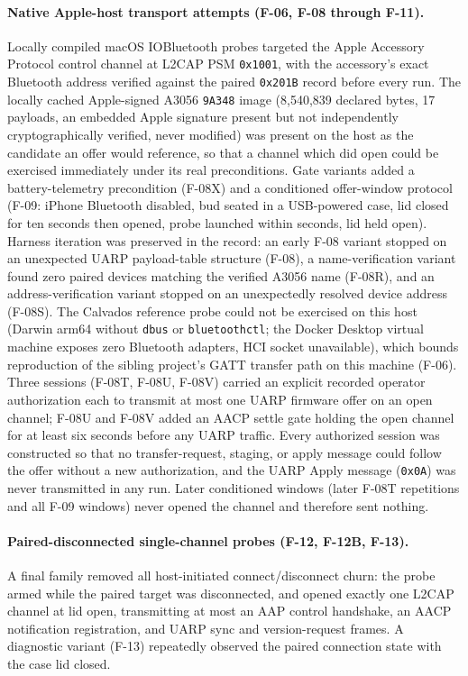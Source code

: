 \documentclass[11pt,letterpaper]{article}
\begin{document}
\paragraph{Native Apple-host transport attempts (F-06, F-08 through F-11).}
Locally compiled macOS IOBluetooth probes targeted the Apple Accessory Protocol control channel at L2CAP PSM \texttt{0x1001}, with the accessory's exact Bluetooth address verified against the paired \texttt{0x201B} record before every run. The locally cached Apple-signed A3056 \texttt{9A348} image (8,540,839 declared bytes, 17 payloads, an embedded Apple signature present but not independently cryptographically verified, never modified) was present on the host as the candidate an offer would reference, so that a channel which did open could be exercised immediately under its real preconditions. Gate variants added a battery-telemetry precondition (F-08X) and a conditioned offer-window protocol (F-09: iPhone Bluetooth disabled, bud seated in a USB-powered case, lid closed for ten seconds then opened, probe launched within seconds, lid held open). Harness iteration was preserved in the record: an early F-08 variant stopped on an unexpected UARP payload-table structure (F-08), a name-verification variant found zero paired devices matching the verified A3056 name (F-08R), and an address-verification variant stopped on an unexpectedly resolved device address (F-08S). The Calvados reference probe could not be exercised on this host (Darwin arm64 without \texttt{dbus} or \texttt{bluetoothctl}; the Docker Desktop virtual machine exposes zero Bluetooth adapters, HCI socket unavailable), which bounds reproduction of the sibling project's GATT transfer path on this machine (F-06). Three sessions (F-08T, F-08U, F-08V) carried an explicit recorded operator authorization each to transmit at most one UARP firmware offer on an open channel; F-08U and F-08V added an AACP settle gate holding the open channel for at least six seconds before any UARP traffic. Every authorized session was constructed so that no transfer-request, staging, or apply message could follow the offer without a new authorization, and the UARP Apply message (\texttt{0x0A}) was never transmitted in any run. Later conditioned windows (later F-08T repetitions and all F-09 windows) never opened the channel and therefore sent nothing.

\paragraph{Paired-disconnected single-channel probes (F-12, F-12B, F-13).}
A final family removed all host-initiated connect/disconnect churn: the probe armed while the paired target was disconnected, and opened exactly one L2CAP channel at lid open, transmitting at most an AAP control handshake, an AACP notification registration, and UARP sync and version-request frames. A diagnostic variant (F-13) repeatedly observed the paired connection state with the case lid closed.
\end{document}
